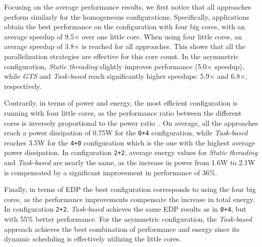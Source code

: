 Focusing on the average performance results, we first notice that all approaches perform similarly for the homogeneous configurations. Specifically, applications obtain the best performance on the configuration with four big cores, with an average speedup of 9.5$\times$ over one little core. When using four little cores, an average speedup of 3.8$\times$ is reached for all approaches. This shows that all the parallelization strategies are effective for this core count. In the asymmetric configuration, \emph{Static threading} slightly improves performance (5.0$\times$ speedup), while \emph{GTS} and \emph{Task-based} reach significantly higher speedups: 5.9$\times$ and 6.8$\times$, respectively.

Contrarily, in terms of power and energy, the most efficient configuration is running with four little cores, as the performance ratio between the different cores is inversely proportional to the power ratio~\cite{Greenhalgh2011}. On average, all the approaches reach a power dissipation of 0.75W for the \texttt{0+4} configuration, while \emph{Task-based} reaches 3.5W for the \texttt{4+0} configuration which is the one with the highest average power dissipation. In configuration \texttt{2+2}, average energy values for \emph{Static threading} and \emph{Task-based} are nearly the same, as the increase in power from 1.6W to 2.1W is compensated by a significant improvement in performance of 36\%.

Finally, in terms of EDP the best configuration corresponds to using the four big cores, as the performance improvements compensate the increase in total energy. In configuration \texttt{2+2}, \emph{Task-based} achieves the same EDP results as in \texttt{0+4}, but with 55\% better performance. For the asymmetric configuration, the \emph{Task-based} approach achieves the best combination of performance and energy since its dynamic scheduling is effectively utilizing the little cores. 



